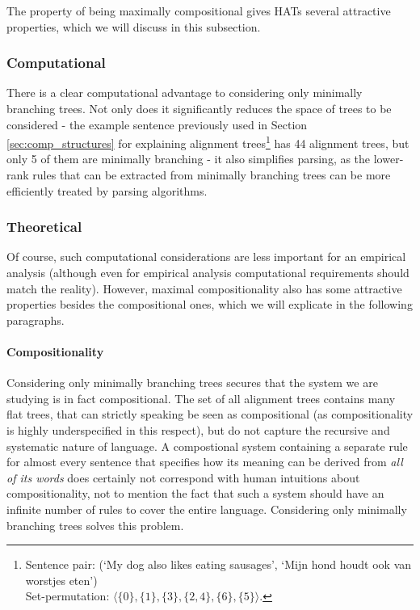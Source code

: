 The property of being maximally compositional gives HATs several attractive properties, which we will discuss in this subsection.

\subsubsection{Computational}
There is a clear computational advantage to considering only minimally branching trees. Not only does it significantly reduces the space of trees to be considered - the example sentence previously used in Section \ref{sec:comp_structures} for explaining alignment trees\footnote{Sentence pair: (`My dog also likes eating sausages', `Mijn hond houdt ook van worstjes eten')\\Set-permutation: $\langle \{0\}, \{1\}, \{3\}, \{2,4\}, \{6\}, \{5\}\rangle$. } has 44 alignment trees, but only 5 of them are minimally branching - it also simplifies parsing, as the lower-rank rules that can be extracted from minimally branching trees can be more efficiently treated by parsing algorithms.

\subsubsection{Theoretical}

Of course, such computational considerations are less important for an empirical analysis (although even for empirical analysis computational requirements should match the reality). However, maximal compositionality also has some attractive properties besides the compositional ones, which we will explicate in the following paragraphs.

\paragraph{Compositionality} Considering only minimally branching trees secures that the system we are studying is in fact compositional. The set of all alignment trees contains many flat trees, that can strictly speaking be seen as compositional (as compositionality is highly underspecified in this respect), but do not capture the recursive and systematic nature of language. A compostional system containing a separate rule for almost every sentence that specifies how its meaning can be derived from \textit{all of its words} does certainly not correspond with human intuitions about compositionality, not to mention the fact that such a system should have an infinite number of rules to cover the entire language. Considering only minimally branching trees solves this problem.

